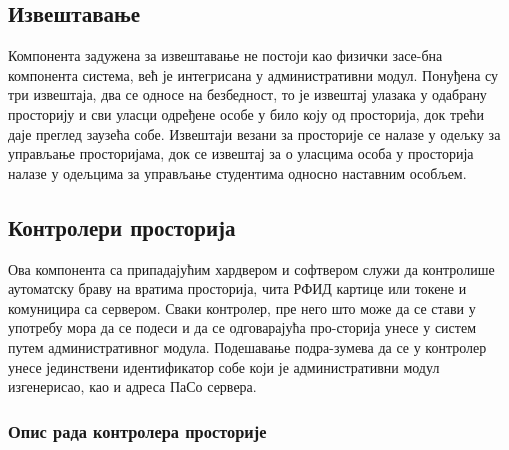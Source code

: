 \documentclass[a4paper, 12pt, diplomski]{etfcyr}
\begin{document}
			\subsection{Извештавање}
				\begin{justify}
					Компонента задужена за извештавање не постоји као физички засе-бна компонента система, већ је интегрисана у административни модул. Понуђена су три извештаја, два се односе на безбедност, то је извештај улазака у одабрану просторију и сви уласци одређене особе у било коју од просторија, док трећи даје преглед заузећа собе. Извештаји везани за просторије се налазе у одељку за управљање просторијама, док се извештај за о уласцима особа у просторија налазе у одељцима за управљање студентима односно наставним особљем.
				\end{justify}

			\subsection{Контролери просторија}
				\begin{justify}
					Ова компонента са припадајућим хардвером и софтвером служи да контролише аутоматску браву на вратима просторија, чита РФИД картице или токене и комуницира са сервером.
					Сваки контролер, пре него што може да се стави у употребу мора да се подеси и да се одговарајућа про-сторија унесе у систем путем административног модула. Подешавање подра-зумева да се у контролер унесе јединствени идентификатор собе који је административни модул изгенерисао, као и адреса ПаСо сервера.
				\end{justify}

				\newpage

				\subsubsection*{Опис рада контролера просторије}
\end{document}
